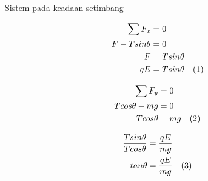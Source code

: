 \begin{enumerate}
    Sistem pada keadaan setimbang
    \vskip5pt
    \begin{minipage}{0.3\textwidth}
    \begin{align*}
        \sum F_{x}&=0\\
        F-Tsin\theta&=0 \\
        F&=Tsin\theta \\
        qE &= Tsin\theta \hskip10pt (1)
    \end{align*}
    \end{minipage}
    \hfill
    \begin{minipage}{0.3\textwidth}
    \begin{align*}
        \sum F_{y}&=0\\
        Tcos\theta-mg&=0\\
        Tcos\theta&=mg \hskip10pt (2)
    \end{align*}
    \end{minipage}
    \hfill
    \begin{minipage}{0.3\textwidth}
    \begin{align*}
        \frac{Tsin\theta}{Tcos\theta}&=\frac{qE}{mg}\\
        tan\theta&=\frac{qE}{mg} \hskip10pt (3)
    \end{align*}
    \end{minipage}
    

\end{enumerate}
